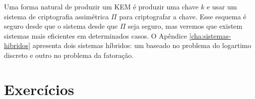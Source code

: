 Uma forma natural de produzir um KEM é produzir uma chave $k$ e usar um sistema de criptografia assimétrica $\Pi$ para criptografar a chave.
Esse esquema é seguro desde que o sistema desde que $\Pi$ seja seguro, mas veremos que existem sistemas mais eficientes em determinados casos.
O Apêndice \ref{cha:sistemas-hibridos} apresenta dois sistemas híbridos: um baseado no problema do logartimo discreto e outro no problema da fatoração.



\section{Exercícios}
\label{sec:exercicios}


\begin{exercicio}
\end{exercicio}

